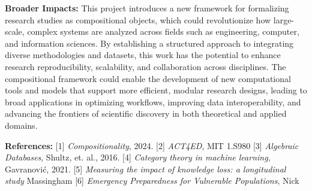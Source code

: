 \documentclass[11pt]{extarticle}
\begin{document}
\textbf{Broader Impacts:} This project introduces a new framework for formalizing research studies as compositional objects, which could revolutionize how large-scale, complex systems are analyzed across fields such as engineering, computer, and information sciences. By establishing a structured approach to integrating diverse methodologies and datasets, this work has the potential to enhance research reproducibility, scalability, and collaboration across disciplines. The compositional framework could enable the development of new computational tools and models that support more efficient, modular research designs, leading to broad applications in optimizing workflows, improving data interoperability, and advancing the frontiers of scientific discovery in both theoretical and applied domains.

\textbf{References:} [1] \textit{Compositionality}, 2024. [2] \textit{ACT4ED}, MIT 1.S980 [3] \textit{Algebraic Databases}, Shultz, et. al., 2016. [4] \textit{Category theory in machine learning}, Gavranović, 2021. [5] \textit{Measuring the impact of knowledge loss: a longitudinal study} Massingham [6] \textit{Emergency Preparedness for Vulnerable Populations}, Nick
\end{document}
